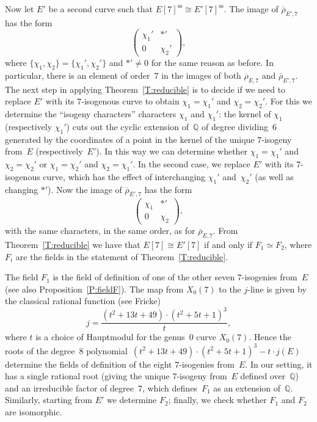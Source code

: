 \documentclass[twoside,leqno,symbols-for-thanks, draft]{rmi}
\numberwithin{equation}{section}
\newcommand{\Q}{\mathbb{Q}}
\newcommand{\rhobar}{{\overline{\rho}}}
\DeclareMathOperator{\sss}{ss}
\theoremstyle{remark}
\begin{document}
Now let $E'$ be a second curve such that $E[7]^{\sss}\cong
E'[7]^{\sss}$. 
The image of $\rhobar_{E',7}$ has the form
\[
  \begin{pmatrix}\chi_1'&*'\\0&\chi_2'  \end{pmatrix},
  \]
where $\{\chi_1,\chi_2\}=\{\chi_1',\chi_2'\}$ and $*' \neq 0$ for the
same reason as before.  In particular, there is an element of
order~$7$ in the images of both $\rhobar_{E,7}$ and $\rhobar_{E',7}$.
The next step in applying Theorem~\ref{T:reducible} is to decide if we
need to replace $E'$ with its $7$-isogenous curve to obtain
$\chi_1=\chi_1'$ and $\chi_2=\chi_2'$. For this we determine the
``isogeny characters'' characters $\chi_1$ and $\chi_1'$: the kernel
of $\chi_1$ (respectively $\chi_1'$) cuts out the cyclic extension
of~$\Q$ of degree dividing~$6$ generated by the coordinates of a point
in the kernel of the unique $7$-isogeny from~$E$ (respectively~$E'$).
In this way we can determine whether $\chi_1=\chi_1'$ and
$\chi_2=\chi_2'$ or $\chi_1=\chi_2'$ and $\chi_2=\chi_1'$.  In the
second case, we replace $E'$ with its $7$-isogenous curve, which has
the effect of interchanging $\chi_1'$ and~$\chi_2'$ (as well as
changing $*'$).  Now the image of $\rhobar_{E',7}$ has the form
\[
\begin{pmatrix}\chi_1&*'\\0&\chi_2  \end{pmatrix},
\]
with the same characters, in the same order, as for
$\rhobar_{E,7}$. From Theorem~\ref{T:reducible} we have that
$E[7]\cong E'[7]$ if and only if $F_1 \simeq F_2$, where $F_i$ are the
fields in the statement of Theorem~\ref{T:reducible}.

The field $F_1$ is the field of definition of one of the other
seven $7$-isogenies from~$E$ (see also Proposition~\ref{P:fieldF}).
The map from $X_0(7)$ to the $j$-line is given by the classical
rational function (see Fricke)
\[
   j = \frac{(t^{2} + 13t + 49) \cdot (t^{2} + 5t + 1)^{3}}{t},
\]
where $t$ is a choice of Hauptmodul for the genus~$0$ curve
$X_0(7)$. Hence the roots of the degree~$8$ polynomial~$(t^{2} + 13t +
49) \cdot (t^{2} + 5t + 1)^{3} -t\cdot j(E)$ determine the fields of
definition of the eight $7$-isogenies from~$E$. In our setting, it has
a single rational root (giving the unique $7$-isogeny from~$E$ defined
over~$\Q$) and an irreducible factor of degree~$7$, which
defines~$F_1$ as an extension of~$\Q$. Similarly, starting from $E'$
we determine $F_2$; finally, we check whether $F_1$ and $F_2$ are
isomorphic.
\end{document}
